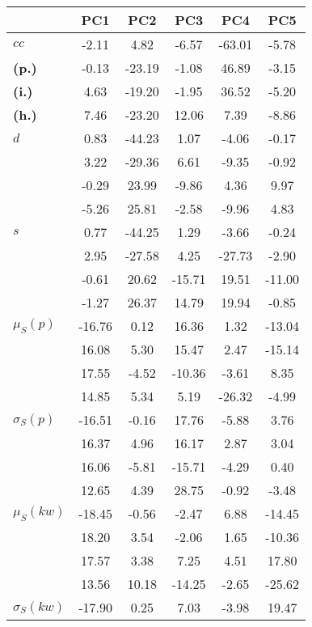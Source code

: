 \begin{table}[h!]
\begin{center}
\begin{tabular}{| l || c | c | c | c | c |}\hline
 & {\bf PC1} & {\bf PC2} & {\bf PC3} & {\bf PC4} & {\bf PC5} \\\hline\hline
{\bf $cc$} & -2.11 & 4.82 & -6.57 & -63.01 & -5.78 \\
{\bf (p.)} & -0.13 & -23.19 & -1.08 & 46.89 & -3.15 \\
{\bf (i.)} & 4.63 & -19.20 & -1.95 & 36.52 & -5.20 \\
{\bf (h.)} & 7.46 & -23.20 & 12.06 & 7.39 & -8.86 \\\hline
{\bf $d$} & 0.83 & -44.23 & 1.07 & -4.06 & -0.17 \\
{\bf } & 3.22 & -29.36 & 6.61 & -9.35 & -0.92 \\
{\bf } & -0.29 & 23.99 & -9.86 & 4.36 & 9.97 \\
{\bf } & -5.26 & 25.81 & -2.58 & -9.96 & 4.83 \\\hline
{\bf $s$} & 0.77 & -44.25 & 1.29 & -3.66 & -0.24 \\
{\bf } & 2.95 & -27.58 & 4.25 & -27.73 & -2.90 \\
 & -0.61  & 20.62  & -15.71  & 19.51  & -11.00 \\
 & -1.27  & 26.37  & 14.79  & 19.94  & -0.85 \\\hline
$\mu_S(p)$ & -16.76  & 0.12  & 16.36  & 1.32  & -13.04 \\
 & 16.08  & 5.30  & 15.47  & 2.47  & -15.14 \\
 & 17.55  & -4.52  & -10.36  & -3.61  & 8.35 \\
 & 14.85  & 5.34  & 5.19  & -26.32  & -4.99 \\\hline
$\sigma_S(p)$ & -16.51  & -0.16  & 17.76  & -5.88  & 3.76 \\
 & 16.37  & 4.96  & 16.17  & 2.87  & 3.04 \\
 & 16.06  & -5.81  & -15.71  & -4.29  & 0.40 \\
 & 12.65  & 4.39  & 28.75  & -0.92  & -3.48 \\\hline
$\mu_S(kw)$ & -18.45  & -0.56  & -2.47  & 6.88  & -14.45 \\
 & 18.20  & 3.54  & -2.06  & 1.65  & -10.36 \\
 & 17.57  & 3.38  & 7.25  & 4.51  & 17.80 \\
 & 13.56  & 10.18  & -14.25  & -2.65  & -25.62 \\\hline
$\sigma_S(kw)$ & -17.90  & 0.25  & 7.03  & -3.98  & 19.47 \\

\end{tabular}
\end{center}
\end{table}
